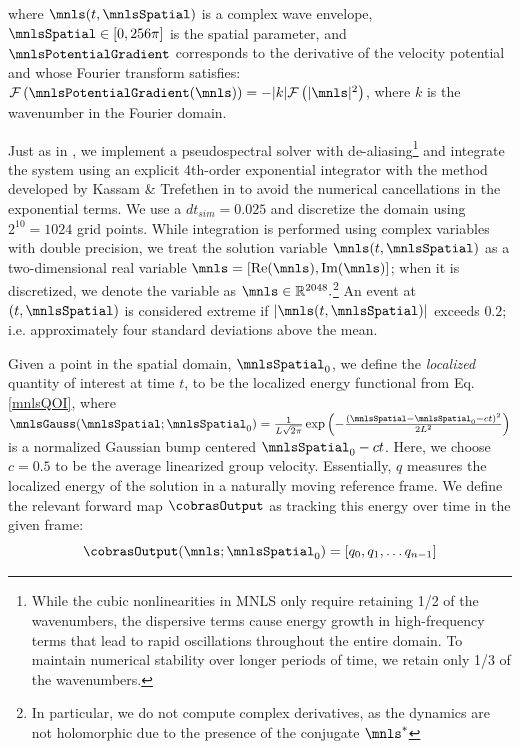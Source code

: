 \documentclass[twocolumn,10pt]{article}
\begin{document}
\noindent where $\mnls(t,\mnlsSpatial)$ is a complex wave envelope, $\mnlsSpatial \in [0, 256\pi]$ is the spatial parameter, 
and
$\mnlsPotentialGradient$  corresponds to the derivative of the velocity potential and whose Fourier transform satisfies: 
$\mathcal F \left(\mnlsPotentialGradient(\mnls)\right)
    = -|k| \mathcal F \left( |\mnls|^2 \right)$, where $k$ is the wavenumber in the Fourier domain. 
    
Just as in \cite{cousins2016a}, we implement a pseudospectral solver with de-aliasing\footnote{While the cubic nonlinearities in MNLS only require retaining 1/2 of the wavenumbers, the dispersive terms cause energy growth in high-frequency terms that lead to rapid oscillations throughout the entire domain. To maintain numerical stability over longer periods of time, we retain only 1/3 of the wavenumbers.} and integrate the system using an explicit 4th-order exponential integrator with the method developed by Kassam \& Trefethen in \cite{kassam2005fourth} to avoid the numerical cancellations in the exponential terms.
We use a $dt_{sim}= 0.025$ and discretize the domain using $2^{10}= 1024$ grid points. While integration is performed using complex variables with double precision, we treat the solution variable $\mnls(t, \mnlsSpatial)$ as a two-dimensional real variable 
$\mnls = [\text{Re}(\mnls), \text{Im}(\mnls)]$; when it is discretized, we denote the variable as
$\mathbf{\mnls} \in \mathbb{R}^{2048}.$\footnote{In particular, we do not compute complex derivatives, as the dynamics are not holomorphic due to the presence of the conjugate $\mnls^*$} An event at $(t, \mnlsSpatial)$ is considered extreme if $|\mnls(t, \mnlsSpatial)|$ exceeds $0.2$; i.e. approximately four standard deviations above the mean.

Given a point in the spatial domain, $\mnlsSpatial_0$, we define the \textit{localized} quantity of interest at time $t$, to be the localized energy functional from Eq. \ref{mnlsQOI}, \noindent where $\mnlsGauss(\mnlsSpatial;\mnlsSpatial_0) = \frac{1}{L\sqrt{2\pi}}\exp\left(-\frac{(\mnlsSpatial - \mnlsSpatial_0 - ct)^2}{2L^2}\right)$ is a normalized Gaussian bump centered $\mnlsSpatial_0 - ct$. Here, we choose $c=0.5$ to be the average linearized group velocity. Essentially, $q$ measures the localized energy of the solution in a naturally moving reference frame.
We define the relevant forward map $\cobrasOutput$ as tracking this energy over time in the given frame:
\begin{equation}
    \cobrasOutput(\mnls; \mnlsSpatial_0) = [q_0, q_1, \dots q_{n-1}]  
\end{equation}
\end{document}
